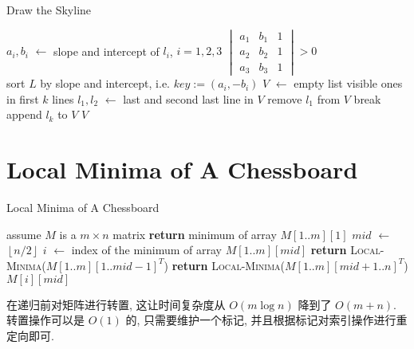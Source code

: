 \documentclass{ctexart}
\newcommand{\floor}[1]{\left\lfloor#1\right\rfloor}
\newcommand{\Let}[1]{\State #1 $\gets$}
\newcommand{\F}[2]{\textsc{#1}(#2)}
\newcommand{\Ret}[1]{\State \textbf{return} #1}
\begin{document}
\begin{algorithm}[H]
    \caption{Draw the Skyline}
    \begin{algorithmic}
        \Let{$a_i, b_i$} slope and intercept of $l_i$, $i=1,2,3$
        \Ret $\begin{vmatrix}
                a_1 & b_1 & 1 \\
                a_2 & b_2 & 1 \\
                a_3 & b_3 & 1
            \end{vmatrix} > 0$
        \EndFunction
        \\
        \State sort $L$ by slope and intercept, i.e. $key := (a_i, -b_i)$
        \Let{$V$} empty list
        \Comment visible ones in first $k$ lines        
                \Let{$l_1, l_2$} last and second last line in $V$
                \If{\F{Hidden}{$l_2, l_1, l_k$}}
                    \State remove $l_1$ from $V$
                \Else                    
                    \State break
                \EndIf
            \EndWhile
            \State append $l_k$ to $V$
        \EndFor
        \Ret $V$
        \EndFunction
    \end{algorithmic}
\end{algorithm}

\section{Local Minima of A Chessboard}

\begin{algorithm}[H]
    \caption{Local Minima of A Chessboard}
    \begin{algorithmic}
            \State assume $M$ is a $m \times n$ matrix
                \Ret minimum of array $M[1..m][1]$
            \EndIf
            \Let{$mid$} $\floor{n/2}$
            \Let{$i$} index of the minimum of array $M[1..m][mid]$
                \Ret \F{Local-Minima}{$M[1..m][1..mid-1]^T$}                
                \Ret \F{Local-Minima}{$M[1..m][mid+1..n]^T$}
            \Else
                \Ret $M[i][mid]$
            \EndIf
        \EndFunction
    \end{algorithmic}
\end{algorithm}

在递归前对矩阵进行转置, 这让时间复杂度从 $O(m\log n)$ 降到了 $O(m + n)$.
转置操作可以是 $O(1)$ 的, 只需要维护一个标记, 并且根据标记对索引操作进行重定向即可.
\end{document}
